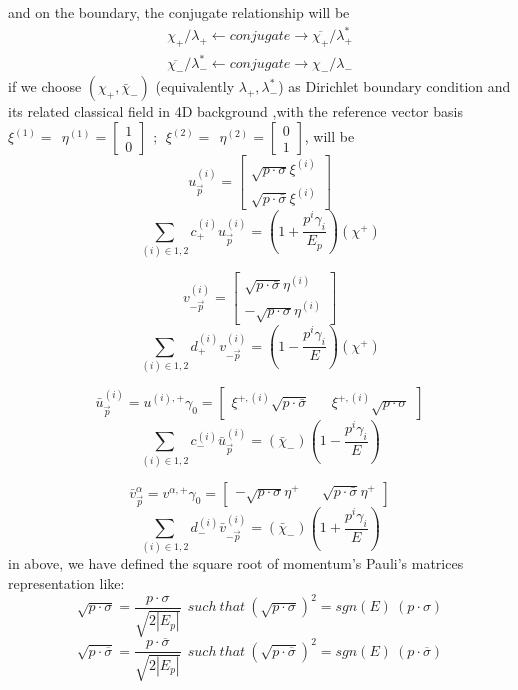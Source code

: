 \documentclass[11pt,a4paper]{article}
\begin{document}
and on the boundary, the conjugate relationship will be
\begin{equation}
  \begin{array}{l}
\chi _{+} /\lambda _{+}\leftarrow conjugate\rightarrow \overline{\chi _{+}} /\lambda _{+}^{*}\\
\overline{\chi _{-}} /\lambda _{-}^{*}\leftarrow conjugate\rightarrow \chi _{-} /\lambda _{-}
\end{array}
\end{equation}
if we choose $(\chi_+,\bar \chi_-)$ (equivalently $\lambda_+,\lambda_-^*$) as Dirichlet boundary condition and its related classical field in 4D background ,with the reference vector basis \(\xi ^{( 1)} =\ \ \eta ^{( 1)} =\begin{bmatrix}
1\\
0
\end{bmatrix} \ \ ;\ \ \xi ^{( 2)} =\ \ \eta ^{( 2)} =\begin{bmatrix}
0\\
1
\end{bmatrix}\),
will be
\[u_{\vec{p}}^{(i)} = \begin{bmatrix}
        \sqrt{p \cdot\sigma} {\xi}^{(i)} \\
        \sqrt{p \cdot \bar\sigma} {\xi}^{(i)}
    \end{bmatrix} \]
    \[\sum_{(i)\in {1,2}}  c^{(i)}_+ u_{\vec{p}}^{(i)} = (1+\frac{p^i\gamma_i }{E_p}) (\chi^+)\]
    
\[v_{-\vec{p}}^{(i)} = \begin{bmatrix}
        \sqrt{p\cdot\bar\sigma} {\eta}^{(i)} \\
        -\sqrt{p\cdot\sigma} {\eta}^{(i)}
    \end{bmatrix}\]
     \[\sum_{(i)\in {1,2}}  d^{(i)}_+ v_{-\vec{p}}^{(i)} = (1-\frac{p^i \gamma_i}{E}) (\chi^+)\]
     
    
\[\bar u_{\vec{p}}^{(i)} = u^{(i),+} \gamma_0 = \begin{bmatrix}
    \xi^{+,(i)} \sqrt{p \cdot\bar\sigma} && \xi^{+,(i)} \sqrt{p \cdot\sigma}
    \end{bmatrix} \] \[\sum_{(i)\in {1,2}}  c^{(i)}_- \bar u_{\vec{p}}^{(i)} =  (\bar \chi_-)(1-\frac{p^i \gamma_i}{E})\]
    
    
    
\[\bar v_{\vec{p}}^{\alpha} = v^{\alpha,+} \gamma_0  = \begin{bmatrix}
   - \sqrt{p \cdot \sigma}\eta^{+} && \sqrt{p \cdot\bar\sigma}\eta^+
    \end{bmatrix}\]\[\sum_{(i)\in {1,2}}  d^{(i)}_- \bar v_{-\vec{p}}^{(i)} =  (\bar \chi_-)(1+\frac{p^i \gamma_i}{E})\]
in above, we have defined the square root of momentum's Pauli's matrices representation like:
\[
\sqrt{p\cdot \sigma } =\frac{p\cdot \sigma }{\sqrt{2|E_{p} |}} \ \ such\ that\ \left(\sqrt{p\cdot \sigma }\right)^{2} =sgn( E) \ ( p\cdot \sigma )
\]
\[
\sqrt{p\cdot \overline{\sigma }} =\frac{p\cdot \overline{\sigma }}{\sqrt{2|E_{p} |}} \ \ such\ that\ \left(\sqrt{p\cdot \overline{\sigma }}\right)^{2} =sgn( E) \ ( p\cdot \overline{\sigma })
\]
\end{document}
